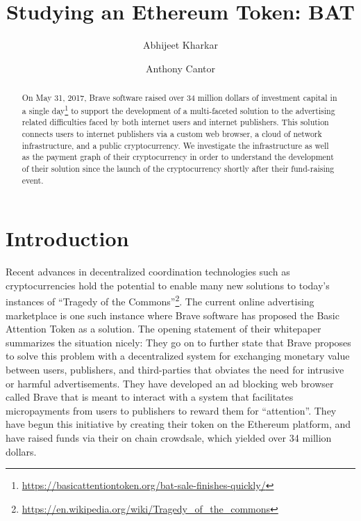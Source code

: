 \documentclass[sigconf]{acmart}
\begin{document}
\title{Studying an Ethereum Token: BAT}

\author{Abhijeet Kharkar}

\author{Anthony Cantor}


\begin{abstract}
On May 31, 2017, Brave software raised over 34 million dollars
of investment capital
in a single day\footnote{\url{https://basicattentiontoken.org/bat-sale-finishes-quickly/}}
to support the development of a multi-faceted
solution to the advertising related
difficulties faced by both internet users and
internet publishers. This solution connects
users to internet publishers via
a custom web browser, a cloud of network infrastructure,
and a public cryptocurrency.
We investigate the infrastructure as well
as the payment graph of their cryptocurrency
in order to understand the development
of their solution since the launch of the
cryptocurrency shortly after their fund-raising event.
\end{abstract}

\maketitle

\section{Introduction}
Recent advances in decentralized coordination technologies such as cryptocurrencies
hold the potential to enable many new solutions to today's instances of
``Tragedy of the Commons''\footnote{\url{https://en.wikipedia.org/wiki/Tragedy\_of\_the\_commons}}.
The current online advertising marketplace is one such instance where
Brave software has
proposed the Basic Attention Token as a solution.
The opening statement of their whitepaper \cite{BAT-wp} summarizes the situation nicely:
They go on to further state that 
Brave proposes to solve this problem with
a decentralized system for exchanging monetary value
between users, publishers, and third-parties that obviates the
need for intrusive or harmful advertisements. 
They have developed an ad blocking web browser called Brave
that is meant to interact with a system that facilitates
micropayments from users to publishers to reward them for ``attention''.
They have begun this initiative by creating
their token on the Ethereum platform,
and have raised funds via their on chain crowdsale,
which yielded over 34 million dollars.
\end{document}
